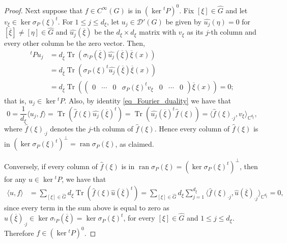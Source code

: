\documentclass[11pt]{amsart}
\numberwithin{theorem}{section}
\numberwithin{equation}{section}
\theoremstyle{definition}
\numberwithin{example}{section}
\theoremstyle{definition}
\theoremstyle{definition}
\newcommand{\C}{\mathbb{C}}
\newcommand{\Tr}{\operatorname{Tr}}
\begin{document}
\begin{proof}
Next suppose that $f\in C^\infty(G)$ is in $(\ker {}^tP)^{0}$. Fix $[\xi]\in\widehat{G}$ and let $v_\xi \in \ker \sigma_P({\xi})^t$. For $1\leq j\leq d_\xi$, let $u_j\in \mathcal{D}'(G)$ be given by $\widehat{u_j}(\eta)=0$ for $[\overline{\xi}]\neq [\eta]\in\widehat{G}$ and $\widehat{u_j}(\overline{\xi})$ be the $d_\xi\times d_\xi$ matrix  with $v_\xi$ as its $j$-th column and every other column be the zero vector. Then,
\begin{align*}
    {}^tPu_j&=d_{\overline\xi} \Tr(\sigma_{{}^tP}(\overline{\xi})\widehat{u_j}(\overline\xi)\overline{\xi}(x))\\
    &=d_{\overline{\xi}} \Tr(\sigma_{P}({\xi})^t\widehat{u_j}(\overline{\xi})\overline{\xi}(x))\\
    &=d_{\overline{\xi}}\Tr\left(\begin{pmatrix}
        0&\cdots&0& \sigma_{P}({\xi})^tv_\xi&0&\cdots&0
    \end{pmatrix}\overline{\xi}(x)\right)=0;
\end{align*}
that is, $u_j\in \ker {}^tP$.
Also, by identity \eqref{eq_Fourier_duality} we have that
    \begin{equation*}
        0= \frac{1}{d_\xi}\langle u_j,f\rangle = \Tr (\widehat{f}({\xi})\widehat{u_j}(\overline{\xi})^t)=\Tr (\widehat{u_j}(\overline{\xi})^t\widehat{f}({\xi}))=\langle \widehat{f}({\xi})_{\cdot j},v_\xi\rangle_{\C^{d_\xi}},
    \end{equation*}
    where $\widehat{f}({\xi})_{\cdot j}$ denotes the $j$-th column of $\widehat{f}({\xi})$. Hence every column of $\widehat{f}({\xi})$ is in $(\ker \sigma_{P}({\xi})^t)^\perp=\operatorname{ran}\sigma_P({\xi})$, as claimed.
    
    Conversely, if  every column of $\widehat{f}(\xi)$ is in $\operatorname{ran}\sigma_P(\xi)=(\ker \sigma_{P}(\xi)^t)^\perp$, then for any $u\in \ker {}^tP$, we have that 
    \begin{align*}
        \langle u,f\rangle&=\sum_{[\xi]\in\widehat{G}} d_\xi \Tr(\widehat{f}(\xi)\widehat{u}(\overline{\xi})^t)
        =\sum_{[\xi]\in\widehat{G}} d_\xi\sum_{j=1}^{d_\xi}\langle \widehat{f}({\xi})_{\cdot j},\widehat{u}(\overline{\xi})_{\cdot j}\rangle_{\C^{d_\xi}}=0,
    \end{align*}
    since every term in the sum above is equal to zero as $\widehat{u}(\overline{\xi})_{\cdot j}\in \ker \sigma_{{}^tP}(\overline{\xi})=\ker \sigma_P(\xi)^t$, for every $[\xi]\in\widehat{G}$ and $1\leq j\leq d_\xi$. Therefore $f\in (\ker {}^tP)^{0}$.
\end{proof}
\end{document}
